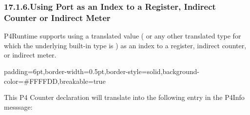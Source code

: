 \documentclass[11pt]{article}
\begin{document}
{%
\subsubsection{17.1.6.\hspace*{0.5em}Using Port as an Index to a Register, Indirect Counter or Indirect Meter}\label{sec-using-port-as-an-index-to-a-register-indirect-counter-or-indirect-meter}%

\noindent{}P4Runtime supports using a translated value ( or any other translated
type for which the underlying built-in type is ) as an index to a
register, indirect counter, or indirect meter.%

\begin{mdbmargintb}{6pt}{6pt}%
\begin{mdblock}{padding=6pt,border-width=0.5pt,border-style=solid,background-color=\#FFFFDD,breakable=true}%
\begin{mdpre}%
\end{mdpre}%
\end{mdblock}%
\end{mdbmargintb}%

\noindent{}This P4 Counter declaration will translate into the following entry in the
P4Info messsage:%

}
\end{document}
